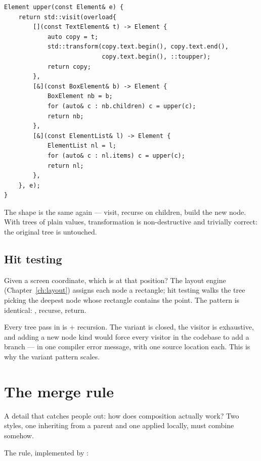\begin{lstlisting}
Element upper(const Element& e) {
    return std::visit(overload{
        [](const TextElement& t) -> Element {
            auto copy = t;
            std::transform(copy.text.begin(), copy.text.end(),
                           copy.text.begin(), ::toupper);
            return copy;
        },
        [&](const BoxElement& b) -> Element {
            BoxElement nb = b;
            for (auto& c : nb.children) c = upper(c);
            return nb;
        },
        [&](const ElementList& l) -> Element {
            ElementList nl = l;
            for (auto& c : nl.items) c = upper(c);
            return nl;
        },
    }, e);
}
\end{lstlisting}

The shape is the same again --- visit, recurse on children, build
the new node. With trees of plain values, transformation is
non-destructive and trivially correct: the original tree is
untouched.

\subsection{Hit testing}

Given a screen coordinate, which  is at that position?
The layout engine (Chapter~\ref{ch:layout}) assigns each node a
rectangle; hit testing walks the tree picking the deepest node
whose rectangle contains the point. The pattern is identical:
, recurse, return.

\begin{idea}
Every tree pass in \maya{} is  + recursion. The
variant is closed, the visitor is exhaustive, and adding a new node
kind would force every visitor in the codebase to add a branch ---
in one compiler error message, with one source location each. This
is why the variant pattern scales.
\end{idea}

\section{The  merge rule}
\label{sec:elem:style-merge}

A detail that catches people out: how does  composition
actually work? Two styles, one inheriting from a parent and one
applied locally, must combine somehow.

The rule, implemented by :

